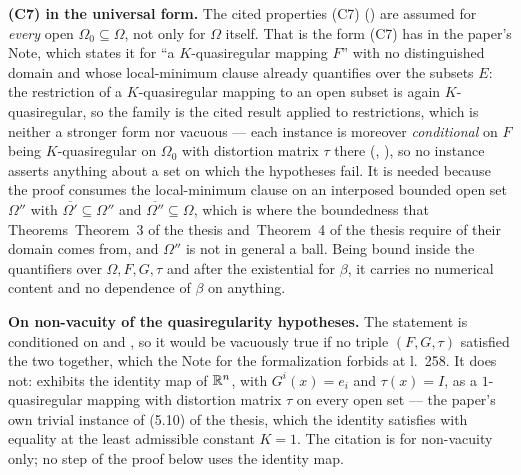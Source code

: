 \begin{theorem}[Theorem 7]
\medskip
\noindent\textbf{(C7) in the universal form.}  The cited properties (C7)
() are assumed for \emph{every} open
$\Omega_0\subseteq\Omega$, not only for $\Omega$ itself.  That is the form (C7)
has in the paper's Note, which states it for ``a $K$-quasiregular mapping $F$''
with no distinguished domain and whose local-minimum clause already quantifies
over the subsets $E$: the restriction of a $K$-quasiregular mapping to an open
subset is again $K$-quasiregular, so the family is the cited result applied to
restrictions, which is neither a stronger form nor vacuous --- each instance is
moreover \emph{conditional} on $F$ being $K$-quasiregular on $\Omega_0$ with
distortion matrix $\tau$ there (,
), so no instance asserts anything about a set on
which the hypotheses fail.  It is needed because the proof consumes the
local-minimum clause on an interposed bounded open set $\Omega''$ with
$\overline{\Omega'}\subseteq\Omega''$ and
$\overline{\Omega''}\subseteq\Omega$, which is where the boundedness that
Theorems~Theorem~3 of the thesis and~Theorem~4 of the thesis require of their domain comes from, and
$\Omega''$ is not in general a ball.  Being bound inside the quantifiers over
$\Omega,F,G,\tau$ and after the existential for $\beta$, it carries no
numerical content and no dependence of $\beta$ on anything.

\textbf{On non-vacuity of the quasiregularity hypotheses.}  The statement is
conditioned on  and , so it
would be vacuously true if no triple $(F,G,\tau)$ satisfied the two together,
which the Note for the formalization forbids at l.~258.  It does not:
 exhibits the identity map of $\mathbb{R}^n$, with
$G^i(x)=e_i$ and $\tau(x)=I$, as a $1$-quasiregular mapping with distortion
matrix $\tau$ on every open set --- the paper's own trivial instance of
(5.10) of the thesis, which the identity satisfies with equality at the least
admissible constant $K=1$.  The citation is for non-vacuity only; no step of the
proof below uses the identity map.
\end{theorem}
